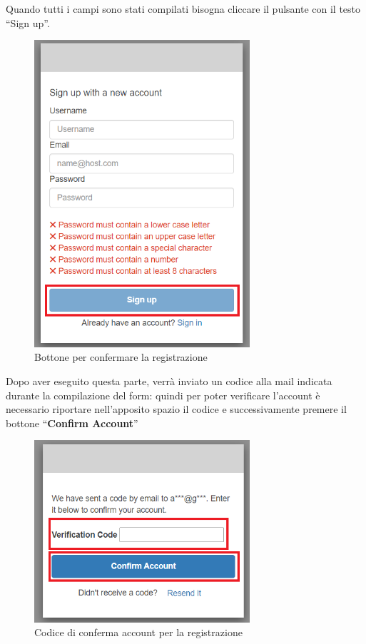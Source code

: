 {Quando tutti i campi sono stati compilati bisogna cliccare il pulsante con il testo ``Sign up''. 
\begin{figure}[H]
    \includegraphics[width=8cm]{sezioni/images/tasto-conf-reg.png}
    \centering
    \caption{Bottone per confermare la registrazione}
\end{figure} 
Dopo aver eseguito questa parte, verrà inviato un codice alla mail indicata durante la compilazione del form: quindi per poter verificare
l'account è necessario riportare nell'apposito spazio il codice e successivamente premere il bottone ``\textbf{Confirm Account}'' 
\begin{figure}[H]
    \includegraphics[width=8cm]{sezioni/images/codice-reg.png}
    \centering
    \caption{Codice di conferma account per la registrazione}
\end{figure}

}
